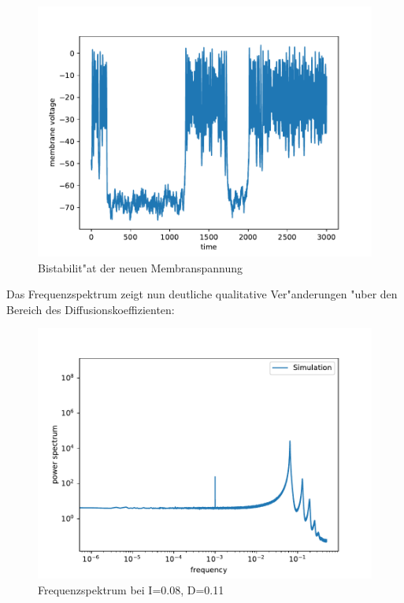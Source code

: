 \documentclass[12pt,a4paper]{article}
\begin{document}
\begin{figure}[H]
	\centering
	\includegraphics[scale=0.9]{realstate2.pdf}
	\caption{Bistabilit"at der neuen Membranspannung}
	\label{realburst}
\end{figure}
Das Frequenzspektrum zeigt nun deutliche qualitative Ver"anderungen "uber den Bereich des Diffusionskoeffizienten:
\begin{figure}[H]
	\centering
	\includegraphics[scale=0.9]{inapikrealfast26jj19.pdf}
	\caption{Frequenzspektrum bei I=0.08, D=0.11}
	\label{deltaspectrum}
\end{figure}
\end{document}
